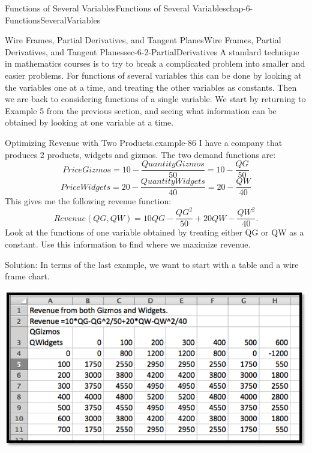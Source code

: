 \documentclass[oneside,10pt,]{book}
\numberwithin{equation}{section}
\begin{document}
\begin{chapterptx}{Functions of Several Variables}{}{Functions of Several Variables}{}{}{chap-6-FunctionsSeveralVariables}
\begin{sectionptx}{Wire Frames, Partial Derivatives, and Tangent Planes}{}{Wire Frames, Partial Derivatives, and Tangent Planes}{}{}{sec-6-2-PartialDerivatives}
\hypertarget{p-2204}{}%
A standard technique in mathematics courses is to try to break a complicated problem into smaller and easier problems.  For functions of several variables this can be done by looking at the variables one at a time, and treating the other variables as constants.  Then we are back to considering functions of a single variable.  We start by returning to Example 5 from the previous section, and seeing what information can be obtained by looking at one variable at a time.%
\begin{example}{Optimizing Revenue with Two Products.}{example-86}%
\hypertarget{p-2205}{}%
I have a company that produces 2 products, widgets and gizmos.  The two demand functions are:%
%
\begin{equation*}
PriceGizmos=10-\frac{QuantityGizmos}{50}=10-\frac{QG}{50}
\end{equation*}
%
\begin{equation*}
PriceWidgets=20-\frac{QuantityWidgets}{40}=20-\frac{QW}{40}
\end{equation*}
\hypertarget{p-2206}{}%
This gives me the following revenue function:%
%
\begin{equation*}
Revenue(QG,QW)=10QG-\frac{QG^2}{50}+20QW-\frac{QW^2}{40}.
\end{equation*}
\hypertarget{p-2207}{}%
Look at the functions of one variable obtained by treating either QG or QW as a constant.  Use this information to find where we maximize revenue.%
\par
\hypertarget{p-2208}{}%
Solution:  In terms of the last example, we want to start with a table and a wire frame chart.%
\begin{sidebyside}{1}{0.2}{0.2}{0}%
\begin{sbspanel}{0.6}%
\includegraphics[width=1\linewidth]{images/sec-6-2-1.png}
\end{sbspanel}%
\end{sidebyside}%

\end{example}
\end{sectionptx}
\end{chapterptx}
\end{document}

